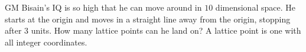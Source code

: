 GM Bisain's IQ is so high that he can move around in $10$ dimensional space. He starts at the origin and moves in a straight line away from the origin, stopping after $3$ units. How many lattice points can he land on? A lattice point is one with all integer coordinates.